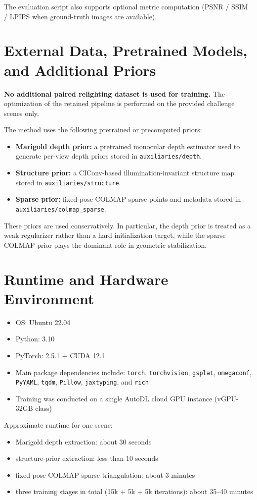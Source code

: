 \documentclass[10pt,a4paper]{article}
\begin{document}
The evaluation script also supports optional metric computation (PSNR / SSIM / LPIPS when ground-truth images are available).

\section{External Data, Pretrained Models, and Additional Priors}
\textbf{No additional paired relighting dataset is used for training.} The optimization of the retained pipeline is performed on the provided challenge scenes only.

The method uses the following pretrained or precomputed priors:
\begin{itemize}[leftmargin=2em]
  \item \textbf{Marigold depth prior:} a pretrained monocular depth estimator used to generate per-view depth priors stored in \texttt{auxiliaries/depth}.
  \item \textbf{Structure prior:} a CIConv-based illumination-invariant structure map stored in \texttt{auxiliaries/structure}.
  \item \textbf{Sparse prior:} fixed-pose COLMAP sparse points and metadata stored in \texttt{auxiliaries/colmap\_sparse}.
\end{itemize}

These priors are used conservatively. In particular, the depth prior is treated as a weak regularizer rather than a hard initialization target, while the sparse COLMAP prior plays the dominant role in geometric stabilization.

\section{Runtime and Hardware Environment}
\begin{itemize}[leftmargin=2em]
  \item OS: Ubuntu 22.04
  \item Python: 3.10
  \item PyTorch: 2.5.1 + CUDA 12.1
  \item Main package dependencies include: \texttt{torch}, \texttt{torchvision}, \texttt{gsplat}, \texttt{omegaconf}, \texttt{PyYAML}, \texttt{tqdm}, \texttt{Pillow}, \texttt{jaxtyping}, and \texttt{rich}
  \item Training was conducted on a single AutoDL cloud GPU instance (vGPU-32GB class)
\end{itemize}

Approximate runtime for one scene:
\begin{itemize}[leftmargin=2em]
  \item Marigold depth extraction: about 30 seconds
  \item structure-prior extraction: less than 10 seconds
  \item fixed-pose COLMAP sparse triangulation: about 3 minutes
  \item three training stages in total (15k + 5k + 5k iterations): about 35--40 minutes
\end{itemize}
\end{document}
